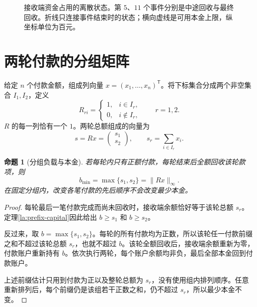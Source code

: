 \documentclass[UTF8,a4paper]{ctexbook}
\newtheorem{proposition}[theorem]{命题}
\theoremstyle{definition}
\numberwithin{equation}{chapter}
\newcommand{\1}{\mathbf{1}}
\begin{document}
\begin{figure}[htbp]
\centering
{}
\caption{接收端资金占用的离散状态。第 $5$、$11$ 个事件分别是中途回收与最终回收。折线只连接事件结束时的状态；横向虚线是可用本金上限，纵坐标单位为百元。}
\label{la:prefix-plot}
\end{figure}

\section{两轮付款的分组矩阵}

给定 $n$ 个付款金额，组成列向量 $x=(x_1,\ldots,x_n)^{\mathsf T}$。将下标集合分成两个非空集合 $I_1,I_2$，定义
\[
R_{ri}=\begin{cases}1,&i\in I_r,\\0,&i\notin I_r,\end{cases}
\qquad r=1,2.
\]
$R$ 的每一列恰有一个 $1$。两轮总额组成的向量为
\begin{equation}\label{la:load-operator}
s=Rx=\begin{pmatrix}s_1\\s_2\end{pmatrix},
\qquad s_r=\sum_{i\in I_r}x_i.
\end{equation}

\begin{proposition}[分组负载与本金]\label{la:round-max}
若每轮内只有正额付款，每轮结束后全额回收该轮款项，则
\begin{equation}\label{la:round-norm}
b_{\min}=\max\{s_1,s_2\}=\lVert Rx\rVert_\infty.
\end{equation}
在固定分组内，改变各笔付款的先后顺序不会改变最少本金。
\end{proposition}

\begin{proof}
每轮最后一笔付款完成而尚未回收时，接收端余额恰好等于该轮总额 $s_r$。定理\ref{la:prefix-capital}因此给出 $b\ge s_1$ 和 $b\ge s_2$。

反过来，取 $b=\max\{s_1,s_2\}$。每轮的所有付款均为正数，所以该轮任一付款前缀之和不超过该轮总额 $s_r$，也就不超过 $b$。该轮全额回收后，接收端余额重新为零，付款账户重新持有 $b$。依次执行两轮，每个账户余额均非负，最后全部本金回到付款账户。

上述前缀估计只用到付款为正以及整轮总额为 $s_r$，没有使用组内排列顺序。任意重新排列后，每个前缀仍是该组若干正数之和，仍不超过 $s_r$，所以最少本金不变。
\end{proof}
\end{document}
